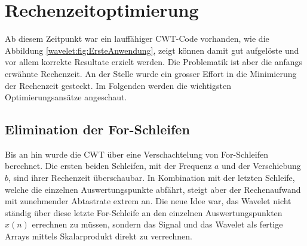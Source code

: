 %
%
%
%
\section{Rechenzeitoptimierung
\label{wavelets:section:teil3}}
Ab diesem Zeitpunkt war ein lauffähiger CWT-Code vorhanden, wie die
Abbildung \ref{wavelet:fig:ErsteAnwendung}, zeigt können damit gut
aufgelöste und vor allem korrekte Resultate erzielt werden.
Die Problematik ist aber die anfangs erwähnte Rechenzeit.
An der Stelle wurde ein grosser Effort in die Minimierung der
Rechenzeit gesteckt.
Im Folgenden werden die wichtigsten Optimierungsansätze angeschaut.



\subsection{Elimination der For-Schleifen
	\label{wavelets:subsection:EliminationForSchlaufen}}
Bis an hin wurde die CWT über eine Verschachtelung von For-Schleifen
berechnet.
Die ersten beiden Schleifen, mit der Frequenz $a$ und der Verschiebung
$b$, sind ihrer Rechenzeit überschaubar.
In Kombination mit der letzten Schleife, welche die einzelnen
Auswertungspunkte abfährt, steigt aber der Rechenaufwand mit
zunehmender Abtastrate extrem an.
Die neue Idee war, das Wavelet nicht ständig über diese letzte
For-Schleife an den einzelnen Auswertungspunkten $x(n)$ errechnen
zu müssen, sondern das Signal und das Wavelet als fertige Arrays
mittels Skalarprodukt direkt zu verrechnen.

